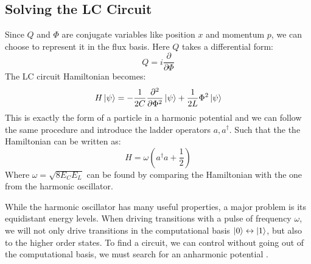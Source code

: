 \subsection{Solving the LC Circuit}\label{sec:forming_qubits}
Since $Q$ and $\Phi$ are conjugate variables like position $x$ and momentum $p$, we can choose to represent it in the flux basis. Here $Q$ takes a differential form:
\begin{equation}
    Q = i\frac{\partial}{\partial \Phi}
\end{equation}
The LC circuit Hamiltonian becomes:
\begin{equation}
    H \ket{\psi} = - \frac{1}{2C} \frac{\partial^2 }{\partial \Phi^2}\ket{\psi} + \frac{1}{2L} \Phi^2 \ket{\psi}
\end{equation}
This is exactly the form of a particle in a harmonic potential and we can follow the same procedure and introduce the ladder operators $a, a^\dagger$. Such that the the Hamiltonian can be written as:
\begin{equation}
    H = \omega \left(a^\dagger a + \frac12\right)
\end{equation}
Where $\omega = \sqrt{8 E_C E_L}$ can be found by comparing the Hamiltonian with the one from the harmonic oscillator.

While the harmonic oscillator has many useful properties, a major problem is its equidistant energy levels. When driving transitions with a pulse of frequency $\omega$, we will not only drive transitions in the computational basis $\ket{0} \leftrightarrow\ket{1}$, but also to the higher order states. To find a circuit, we can control without going out of the computational basis, we must search for an anharmonic potential \cite{krantz_quantum_2019}.

